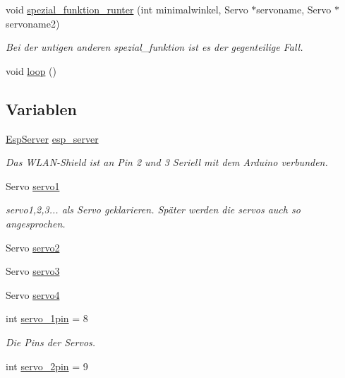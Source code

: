 \begin{DoxyCompactItemize}
void \hyperlink{_arduino__kommentiert_8ino_abf7a5d6cd0eca7c0dacb61f5ef555beb}{spezial\+\_\+funktion\+\_\+runter} (int minimalwinkel, Servo $\ast$servoname, Servo $\ast$servoname2)
\begin{DoxyCompactList}\small\item\em Bei der untigen anderen spezial\+\_\+funktion ist es der gegenteilige Fall. \end{DoxyCompactList}\item 
void \hyperlink{_arduino__kommentiert_8ino_afe461d27b9c48d5921c00d521181f12f}{loop} ()
\end{DoxyCompactItemize}
\subsection*{Variablen}
\begin{DoxyCompactItemize}
\item 
\hyperlink{class_esp_server}{Esp\+Server} \hyperlink{_arduino__kommentiert_8ino_a92309e3a6d185d9188757bac49168fe5}{esp\+\_\+server}
\begin{DoxyCompactList}\small\item\em Das W\+L\+A\+N-\/\+Shield ist an Pin 2 und 3 Seriell mit dem Arduino verbunden. \end{DoxyCompactList}\item 
Servo \hyperlink{_arduino__kommentiert_8ino_ac5d2bea44c6318454db0e2639a4efe95}{servo1}
\begin{DoxyCompactList}\small\item\em servo1,2,3... als Servo geklarieren. Später werden die servos auch so angesprochen. \end{DoxyCompactList}\item 
Servo \hyperlink{_arduino__kommentiert_8ino_a6458146b8e54c3729bbee8c037921c72}{servo2}
\item 
Servo \hyperlink{_arduino__kommentiert_8ino_a7c0244e667b5f7c873df01946f0767bd}{servo3}
\item 
Servo \hyperlink{_arduino__kommentiert_8ino_a207f149c99b91a8bacd26b8b70dfc71c}{servo4}
\item 
int \hyperlink{_arduino__kommentiert_8ino_ac5b3a3df1bbdb6b2c8e8988c7373ad97}{servo\+\_\+1pin} = 8
\begin{DoxyCompactList}\small\item\em Die Pins der Servos. \end{DoxyCompactList}\item 
int \hyperlink{_arduino__kommentiert_8ino_a0fcb42829030c7eab1ede7429256f14d}{servo\+\_\+2pin} = 9

\end{DoxyCompactItemize}

